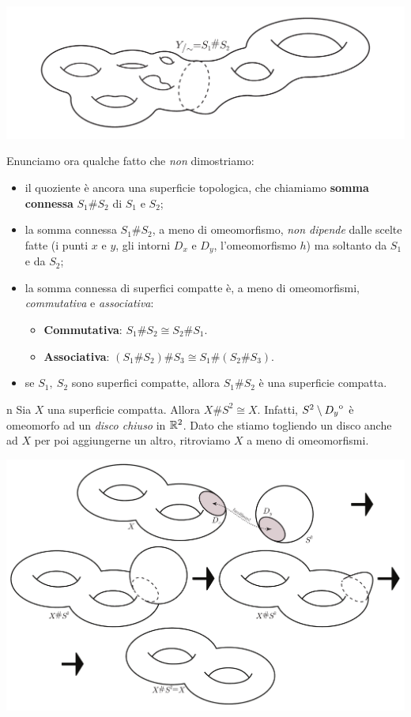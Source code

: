 \begin{center}
	\includegraphics[trim=0cm 0cm 0cm 0cm, clip, scale=0.4]{images/connectedsum3.pdf}
\end{center}
Enunciamo ora qualche fatto che \textit{non} dimostriamo:
	\begin{itemize}
		\item il quoziente è ancora una superficie topologica, che chiamiamo \textbf{somma connessa} $S_1\# S_2$  di $S_1$ e $S_2$;
		\item la somma connessa $S_1\# S_2$, a meno di omeomorfismo, \textit{non dipende} dalle scelte fatte (i punti $x$ e $y$, gli intorni $D_x$ e $D_y$, l'omeomorfismo $h$) ma soltanto da $S_1$ e da $S_2$;
		\item la somma connessa di superfici compatte è, a meno di omeomorfismi, \textit{commutativa} e \textit{associativa}:
		\begin{itemize}
			\item \textbf{Commutativa}: $S_1\# S_2\cong S_2\# S_1$.
			\item \textbf{Associativa}: $\left(S_1\# S_2\right)\# S_3\cong S_1\#\left(S_2\# S_3\right)$.
		\end{itemize}
	\item se $S_1,\ S_2$ sono superfici compatte, allora $S_1\# S_2$ è una superficie compatta.
	\end{itemize}
\begin{remark}{n}
	Sia $X$ una superficie compatta. Allora $X\# S^2\cong X$. Infatti, $S^2\setminus {\kern0ptD_y}^{\mathrm{o}}$ è omeomorfo ad un \textit{disco chiuso} in $\mathbb{R}^2$. Dato che stiamo togliendo un disco anche ad $X$ per poi aggiungerne un altro, ritroviamo $X$ a meno di omeomorfismi.
	\begin{center}
		\includegraphics[trim=0cm 0cm 0cm 0cm, clip, scale=0.4]{images/connectedsumsphere.pdf}
	\end{center}
\end{remark}
